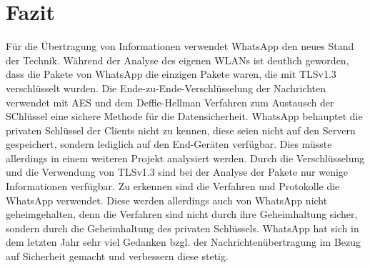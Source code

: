 \section{Fazit}\label{sec:fazit}
Für die Übertragung von Informationen verwendet WhatsApp den neues Stand der Technik. 
Während der Analyse des eigenen WLANs ist deutlich geworden, dass die Pakete von WhatsApp 
die einzigen Pakete waren, die mit TLSv1.3 verschlüsselt wurden. 
Die Ende-zu-Ende-Verschlüsselung der Nachrichten verwendet mit AES und dem Deffie-Hellman Verfahren zum Austausch der SChlüssel
eine sichere Methode für die Datensicherheit. 
WhatsApp behauptet die privaten Schlüssel der Clients nicht zu kennen, diese seien nicht auf den Servern gespeichert, 
sondern lediglich auf den End-Geräten verfügbar. Dies müsste allerdings in einem weiteren 
Projekt analysiert werden. 
Durch die Verschlüsselung und die Verwendung von TLSv1.3 sind bei der Analyse der Pakete nur wenige Informationen 
verfügbar. Zu erkennen sind die Verfahren und Protokolle die WhatsApp verwendet. 
Diese werden allerdings auch von WhatsApp nicht geheimgehalten, denn die Verfahren sind nicht durch ihre Geheimhaltung sicher, sondern durch 
die Geheimhaltung des privaten Schlüssels. WhatsApp hat sich in dem letzten Jahr sehr viel Gedanken bzgl. der Nachrichtenübertragung im Bezug 
auf Sicherheit gemacht und verbessern diese stetig. 
